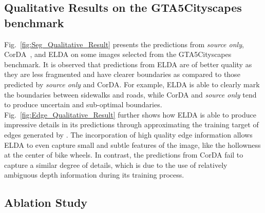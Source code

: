 \documentclass{bmvc2k}
\begin{document}
\subsection{Qualitative Results on the GTA5Cityscapes benchmark}
\label{subsec::qualitative_result}


Fig.~\ref{fig:Seg_Qualitative_Result} presents the predictions from \textit{source only}, CorDA~\cite{wang2021domain}, and ELDA on some images selected from the GTA5Cityscapes benchmark. It is observed that predictions from ELDA are of better quality as they are less fragmented and have clearer boundaries as compared to those predicted by \textit{source only} and CorDA. For example, ELDA is able to clearly mark the boundaries between sidewalks and roads, while CorDA and \textit{source only} tend to produce uncertain and sub-optimal boundaries.  Fig.~\ref{fig:Edge_Qualitative_Result} further shows how ELDA is able to produce impressive details in its predictions through approximating the training target of edges generated by . The incorporation of high quality edge information allows ELDA to even capture small and subtle features of the image, like the hollowness at the center of bike wheels. In contrast, the predictions from CorDA fail to capture a similar degree of details, which is due to the use of relatively ambiguous depth information during its training process.








\subsection{Ablation Study}
\label{subsec::ablation_study}
\end{document}
